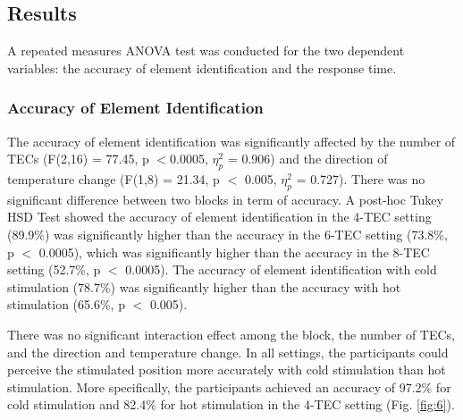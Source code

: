 \documentclass[preprint,12pt]{elsarticle}
\begin{document}

\subsection{Results}
A repeated measures ANOVA test was conducted for the two dependent variables: the accuracy of element identification and the response time.

\subsubsection{Accuracy of Element Identification}
The accuracy of element identification was significantly affected by the number of TECs (F(2,16) = 77.45, p $<$0.0005, $\eta_p^2$ = 0.906) and the direction of temperature change (F(1,8) = 21.34, p $<$ 0.005, $\eta_p^2$ = 0.727). There was no significant difference between two blocks in term of accuracy. A post-hoc Tukey HSD Test showed the accuracy of element identification in the 4-TEC setting (89.9\%) was significantly higher than the accuracy in the 6-TEC setting (73.8\%, p $<$ 0.0005), which was significantly higher than the accuracy in the 8-TEC setting (52.7\%, p $<$ 0.0005). The accuracy of element identification with cold stimulation (78.7\%) was significantly higher than the accuracy with hot stimulation (65.6\%, p $<$ 0.005).

There was no significant interaction effect among the block, the number of TECs, and the direction and temperature change. In all settings, the participants could perceive the stimulated position more accurately with cold stimulation than hot stimulation. More specifically, the participants achieved an accuracy of 97.2\% for cold stimulation and 82.4\% for hot stimulation in the 4-TEC setting (Fig. \ref{fig:6}).
\end{document}
